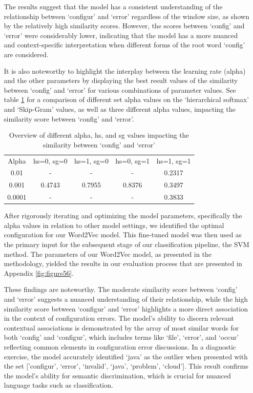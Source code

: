 \documentclass[english,bachelor]{swsLeipzig}
\begin{document}
The results suggest that the model has a consistent understanding of the relationship between `configur' 
and `error' regardless of the window size, as shown by the relatively high similarity scores. However, the scores between `config' and `error' were considerably lower, indicating that the model has a more nuanced and context-specific interpretation when different forms of the root word `config' are considered.

It is also noteworthy to highlight the interplay between the learning rate (alpha) and the other parameters by displaying the best result values of the similarity between `config' and `error' for various combinations of parameter values. See table \ref{tab:table51} for a comparison of different set alpha values on the `hierarchical softmax' and `Skip-Gram' values, as well as three different alpha values, impacting the similarity score between `config' and `error'.

\begin{table}[ht]
  \caption{Overview of different alpha, hs, and sg values impacting the similarity between `config' and `error'}
  \centering
  \begin{tabular}{c|cccc}\toprule
  Alpha & hs=0, sg=0 & hs=1, sg=0 & hs=0, sg=1 & hs=1, sg=1 \\ \cmidrule(l){1-5}
  0.01   & -       & -       & -       & 0.2317 \\
  0.001  & 0.4743  & 0.7955  & 0.8376  & 0.3497 \\
  0.0001 & -       & -       & -       & 0.3833 \\ \bottomrule
  \end{tabular}
  \label{tab:table51}
\end{table}

After rigorously iterating and optimizing the model parameters, specifically the alpha values in 
relation to other model settings, we identified the optimal configuration for our Word2Vec model. This fine-tuned model was then used as the primary input for the subsequent stage of our classification pipeline, the SVM method. The parameters of our Word2Vec model, as presented in the methodology, yielded the results in our evaluation process that are presented in Appendix \ref{fig:figure56}.

These findings are noteworthy. The moderate similarity score between `config' and `error' suggests a 
nuanced understanding of their relationship, while the high similarity score between `configur' and `error' highlights a more direct association in the context of configuration errors. The model's ability to discern relevant contextual associations is demonstrated by the array of most similar words for both `config' and `configur', which includes terms like `file', `error', and `occur' reflecting common elements in configuration error discussions. In a diagnostic exercise, the model accurately identified `java' as the outlier when presented with the set ['configur', `error', `invalid', `java', `problem', `cloud']. This result confirms the model's ability for semantic discrimination, which is crucial for nuanced language tasks such as classification.
\end{document}

